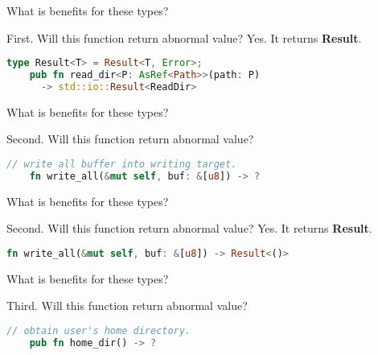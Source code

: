 \documentclass[12pt, unicode]{beamer}
\begin{document}
\begin{frame}[fragile]{What is benefits for these types?}
  \begin{block}{}
    First. Will this function return abnormal value?
    \newline
    Yes. It returns \textbf{Result}.
  \end{block}
  \begin{lstlisting}[language={Rust},basicstyle=\ttfamily\Small]
    type Result<T> = Result<T, Error>;
    pub fn read_dir<P: AsRef<Path>>(path: P)
      -> std::io::Result<ReadDir>
  \end{lstlisting}
\end{frame}

\begin{frame}[fragile]{What is benefits for these types?}
  \begin{block}{}
    Second. Will this function return abnormal value?
  \end{block}
  \begin{lstlisting}[language={Rust},basicstyle=\ttfamily\Small]
    // write all buffer into writing target.
    fn write_all(&mut self, buf: &[u8]) -> ?
  \end{lstlisting}
\end{frame}

\begin{frame}[fragile]{What is benefits for these types?}
  \begin{block}{}
    Second. Will this function return abnormal value?
    \newline
    Yes. It returns \textbf{Result}.
  \end{block}
  \begin{lstlisting}[language={Rust},basicstyle=\ttfamily\Small]
    fn write_all(&mut self, buf: &[u8]) -> Result<()>
  \end{lstlisting}
\end{frame}

\begin{frame}[fragile]{What is benefits for these types?}
  \begin{block}{}
    Third. Will this function return abnormal value?
  \end{block}
  \begin{lstlisting}[language={Rust},basicstyle=\ttfamily\Small]
    // obtain user's home directory.
    pub fn home_dir() -> ?
  \end{lstlisting}
\end{frame}
\end{document}
